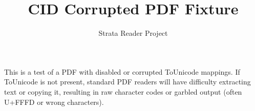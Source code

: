 \documentclass{article}
\title{CID Corrupted PDF Fixture}
\author{Strata Reader Project}
\begin{document}
\maketitle
This is a test of a PDF with disabled or corrupted ToUnicode mappings.
If ToUnicode is not present, standard PDF readers will have difficulty extracting text or copying it, resulting in raw character codes or garbled output (often U+FFFD or wrong characters).
\end{document}
